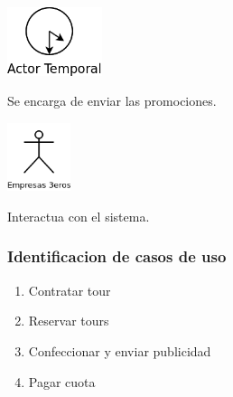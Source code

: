 \documentclass[12pt,a4paper,titlepage,oneside]{article}
\begin{document}
\vspace*{1.5cm}

\begin{minipage}[b]{0.2\linewidth}\centering
	\includegraphics[height=2cm]{actor_temporal}
\end{minipage}
\begin{minipage}[b]{0.8\linewidth}\centering
	\begin{flushleft}
	Se encarga de enviar las promociones. \\
	\end{flushleft}
\end{minipage}

\vspace*{1.5cm}


\begin{minipage}[b]{0.2\linewidth}\centering
	\includegraphics[height=2cm]{actor_empresas}
\end{minipage}
\begin{minipage}[b]{0.8\linewidth}\centering
	\begin{flushleft}
	Interactua con el sistema. \\
	\end{flushleft}
\end{minipage}


\vspace*{1.5cm}



\newpage

\subsubsection{Identificacion de casos de uso}

\begin{enumerate}
\item Contratar tour
\item Reservar tours
\item Confeccionar y enviar publicidad
\item Pagar cuota
\end{enumerate}
\end{document}
